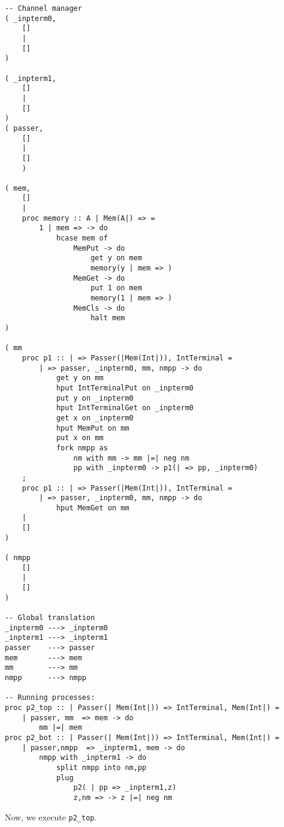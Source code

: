 \documentclass{article}
\theoremstyle{plain}%
\theoremstyle{definition}
\theoremstyle{remark}
\begin{document}
\begin{verbatim}
-- Channel manager
( _inpterm0,  
    []
    |
    []
)

( _inpterm1,  
    []
    |
    []
)
( passer,
    []
    |
    []
    )

( mem,
    []
    |
    proc memory :: A | Mem(A|) => =
        1 | mem => -> do
            hcase mem of
                MemPut -> do
                    get y on mem
                    memory(y | mem => )
                MemGet -> do
                    put 1 on mem
                    memory(1 | mem => )
                MemCls -> do
                    halt mem
)

( mm
    proc p1 :: | => Passer(|Mem(Int|)), IntTerminal = 
        | => passer, _inpterm0, mm, nmpp -> do
            get y on mm
            hput IntTerminalPut on _inpterm0
            put y on _inpterm0
            hput IntTerminalGet on _inpterm0
            get x on _inpterm0
            hput MemPut on mm
            put x on mm
            fork nmpp as
                nm with mm -> mm |=| neg nm 
                pp with _inpterm0 -> p1(| => pp, _inpterm0)
    ;
    proc p1 :: | => Passer(|Mem(Int|)), IntTerminal = 
        | => passer, _inpterm0, mm, nmpp -> do
            hput MemGet on mm 
    |
    []
)

( nmpp
    []
    |
    []
)

-- Global translation
_inpterm0 ---> _inpterm0 
_inpterm1 ---> _inpterm1 
passer    ---> passer 
mem       ---> mem
mm        ---> mm
nmpp      ---> nmpp

-- Running processes:
proc p2_top :: | Passer(| Mem(Int|)) => IntTerminal, Mem(Int|) =
    | passer, mm  => mem -> do
        mm |=| mem
proc p2_bot :: | Passer(| Mem(Int|)) => IntTerminal, Mem(Int|) =
    | passer,nmpp  => _inpterm1, mem -> do
        nmpp with _inpterm1 -> do
            split nmpp into nm,pp
            plug
                p2( | pp => _inpterm1,z)
                z,nm => -> z |=| neg nm
\end{verbatim}
Now, we execute \verb|p2_top|. 
\end{document}
